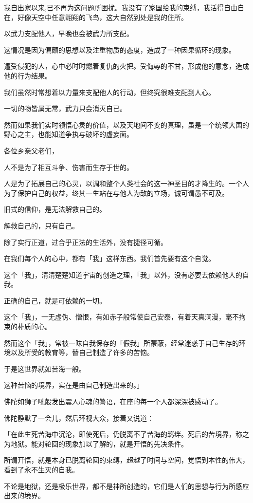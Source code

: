 \documentclass[twoside,openany]{book}
\begin{document}
我自出家以来,已不再为这问题所困扰。我没有了家国给我的束缚，我活得自由自在，好像天空中任意翱翔的飞鸟，这大自然到处是我的住所。

以武力支配他人，早晚也会被武力所支配。

这情况是因为偏颇的思想以及注重物质的态度，造成了一种因果循环的现象。

遭受侵犯的人，心中必时时燃着复仇的火把。受侮辱的不甘，形成他的意念，造成他的行为结果。

我们虽然时常想着以力量来支配他人的行动，但终究很难支配到人心。

一切的物皆属无常，武力只会消灭自已。

然而如果我们实时领悟心灵的价值，以及天地间不变的真理，虽是一个统领大国的野心之主，也能知道争执与破坏的虚妄面。

各位乡亲父老们，

人不是为了相互斗争、伤害而生存于世的。

人是为了拓展自己的心灵，以调和整个人类社会的这一神圣目的才降生的。一个人为了保护自己的权益，终其一生站在与他人为敌的立场，诚可谓愚不可及。

旧式的信仰，是无法解救自己的。

解救自己的，只有自己。

除了实行正道，过合乎正法的生活外，没有捷径可循。

在我们每个人的心中，都有「我」这样东西。我们首先要有这个自觉。

这个「我」，清清楚楚知道宇宙的创造之理，「我」以外，没有必要去依赖他人的自我。

正确的自己，就是可依赖的一切。

这个「我」，一无虚伪、憎恨，有如赤子般常使自己安泰，有着天真澜漫，毫不拘束的朴质的心。

然而这个「我」，常被一昧自我保存的「假我」所蒙蔽，经常迷惑于自己生存的环境以及所受的教育等，替自己制造了许多的苦恼。

于是这世界就如苦海一般。

这种苦恼的境界，实在是由自己制造出来的。」

佛陀如狮子吼般发出震人心魂的警语，在座的每一个人都深深被感动了。

佛陀静默了一会儿，然后环视大众，接着又说道：

「在此生死苦海中沉沦，即使死后，仍脱离不了苦海的羁绊。死后的苦境界，称之为地狱。能对轮回的现象加以了解的，就是开悟的先决条件。

所谓开悟，就是本身已脱离轮回的束缚，超越了时间与空间，觉悟到本性的伟大，看到了永不生灭的自我。

不论是地狱，还是极乐世界，都不是神所创造的，它们是人们的思想与行为所感应出来的境界。
\end{document}
